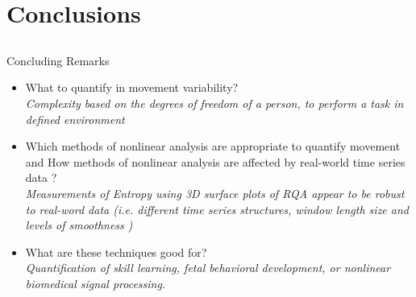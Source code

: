 \section{Conclusions}

\subsection{}
{
\begin{frame}{Concluding Remarks}

\begin{itemize}
	\item What to quantify in movement variability? \\
	\textit{Complexity based on the degrees of freedom of a person,
	to perform a task in defined environment}

	\item Which methods of nonlinear analysis are appropriate to quantify movement and
	How methods of nonlinear analysis are affected by real-world time series data ?\\
	\textit{Measurements of Entropy using 3D surface plots of RQA 
	appear to be robust to real-word data (i.e. different time series
	structures, window length size and levels of smoothness )}

	\item What are these techniques good for?\\
	\textit{Quantification of skill learning, 
	fetal behavioral development, or
	nonlinear biomedical signal processing.}
\end{itemize}

\end{frame}
}

%
%
%
%
%
%


